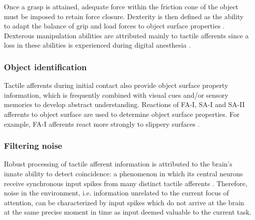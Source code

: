 Once a grasp is attained, adequate force within the friction cone of the object must be imposed to retain force closure.
Dexterity is then defined as the ability to adapt the balance of grip and load forces to object surface properties \cite{howe1993tactile}.
Dexterous manipulation abilities are attributed mainly to tactile afferents since a loss in these abilities is experienced during digital anesthesia \cite{Johansson1984}.

\subsubsection*{Object identification}

Tactile afferents during initial contact also provide object surface property information, which is frequently combined with visual cues and/or sensory memories to develop abstract understanding.
Reactions of FA-I, SA-I and SA-II afferents to object surface are used to determine object surface properties.
For example, FA-I afferents react more strongly to slippery surfaces \cite{burstedt1997coordination}.

\subsubsection*{Filtering noise}

Robust processing of tactile afferent information is attributed to the brain's innate ability to detect coincidence: a phenomenon in which its central neurons receive synchronous input spikes from many distinct tactile afferents \cite{hopfield1995pattern}.
Therefore, noise in the environment, i.e. information unrelated to the current focus of attention, can be characterized by input spikes which do not arrive at the brain at the same precise moment in time as input deemed valuable to the current task.





%


